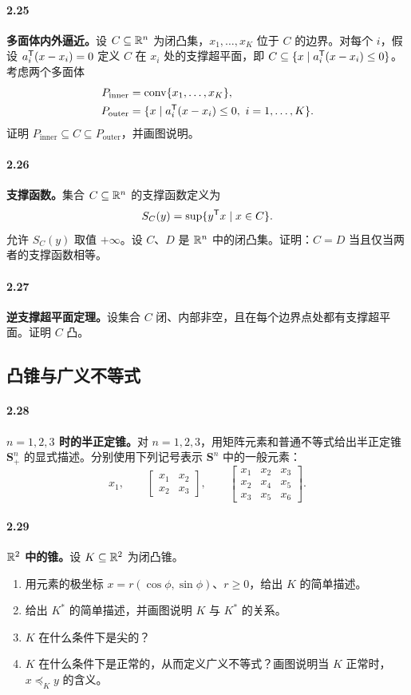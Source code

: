 \paragraph{2.25}
\textbf{多面体内外逼近。}设 $C\subseteq\mathbb R^n$ 为闭凸集，$x_1,\ldots,x_K$ 位于 $C$ 的边界。对每个 $i$，假设 $a_i^{\mathsf T}(x-x_i)=0$ 定义 $C$ 在 $x_i$ 处的支撑超平面，即 $C\subseteq\{x\mid a_i^{\mathsf T}(x-x_i)\le0\}$。考虑两个多面体
\[
\begin{aligned}
 P_{\mathrm{inner}}&=\operatorname{conv}\{x_1,\ldots,x_K\},\\
 P_{\mathrm{outer}}&=\{x\mid a_i^{\mathsf T}(x-x_i)\le0,\ i=1,\ldots,K\}.
\end{aligned}
\]
证明 $P_{\mathrm{inner}}\subseteq C\subseteq P_{\mathrm{outer}}$，并画图说明。

\paragraph{2.26}
\textbf{支撑函数。}集合 $C\subseteq\mathbb R^n$ 的支撑函数定义为
\[
 S_C(y)=\sup\{y^{\mathsf T}x\mid x\in C\}.
\]
允许 $S_C(y)$ 取值 $+\infty$。设 $C$、$D$ 是 $\mathbb R^n$ 中的闭凸集。证明：$C=D$ 当且仅当两者的支撑函数相等。

\paragraph{2.27}
\textbf{逆支撑超平面定理。}设集合 $C$ 闭、内部非空，且在每个边界点处都有支撑超平面。证明 $C$ 凸。

\subsection*{凸锥与广义不等式}
\paragraph{2.28}
\textbf{$n=1,2,3$ 时的半正定锥。}对 $n=1,2,3$，用矩阵元素和普通不等式给出半正定锥 $\mathbf S_+^n$ 的显式描述。分别使用下列记号表示 $\mathbf S^n$ 中的一般元素：
\[
 x_1,\qquad
 \begin{bmatrix}x_1&x_2\\x_2&x_3\end{bmatrix},\qquad
 \begin{bmatrix}x_1&x_2&x_3\\x_2&x_4&x_5\\x_3&x_5&x_6\end{bmatrix}.
\]

\paragraph{2.29}
\textbf{$\mathbb R^2$ 中的锥。}设 $K\subseteq\mathbb R^2$ 为闭凸锥。
\begin{enumerate}[label=(\alph*)]
\item 用元素的极坐标 $x=r(\cos\phi,\sin\phi)$、$r\ge0$，给出 $K$ 的简单描述。
\item 给出 $K^*$ 的简单描述，并画图说明 $K$ 与 $K^*$ 的关系。
\item $K$ 在什么条件下是尖的？
\item $K$ 在什么条件下是正常的，从而定义广义不等式？画图说明当 $K$ 正常时，$x\preceq_K y$ 的含义。
\end{enumerate}

